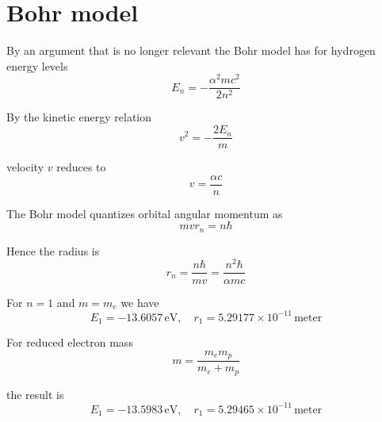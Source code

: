 


\section*{Bohr model}

By an argument that is no longer relevant the Bohr model
has for hydrogen energy levels
\begin{equation*}
E_n=-\frac{\alpha^2mc^2}{2n^2}
\end{equation*}

By the kinetic energy relation
\begin{equation*}
v^2=-\frac{2E_n}{m}
\end{equation*}

velocity $v$ reduces to
\begin{equation*}
v=\frac{\alpha c}{n}
\end{equation*}

The Bohr model quantizes orbital angular momentum as
\begin{equation*}
mvr_n=n\hbar
\end{equation*}

Hence the radius is
\begin{equation*}
r_n=\frac{n\hbar}{mv}=\frac{n^2\hbar}{\alpha mc}
\end{equation*}

For $n=1$ and $m=m_e$ we have
\begin{equation*}
E_1=-13.6057\,\text{eV},\quad
r_1=5.29177\times10^{-11}\,\text{meter}
\end{equation*}

For reduced electron mass
\begin{equation*}
m=\frac{m_em_p}{m_e+m_p}
\end{equation*}

the result is
\begin{equation*}
E_1=-13.5983\,\text{eV},\quad
r_1=5.29465\times10^{-11}\,\text{meter}
\end{equation*}


